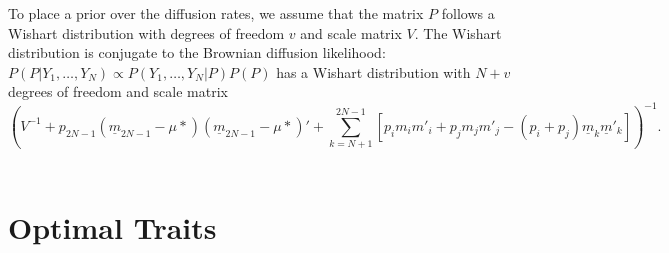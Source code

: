 \documentclass[12pt]{article}
\begin{document}
To place a prior over the diffusion rates, we assume that the matrix $P$ follows a Wishart distribution with degrees
of freedom $v$ and scale matrix $V$.  The Wishart distribution is conjugate to the Brownian diffusion likelihood: 
$P(P | Y_1,\dots,Y_N) \propto  P(Y_1,\dots,Y_N |P) P(P)$ has a Wishart distribution with $N+v$ degrees of freedom and scale matrix
\begin{equation*}
\left( V^{-1} + p_{2N-1}(\underline{m}_{2N-1} - \mu*)(\underline{m}_{2N-1} - \mu*)'  
+ \sum_{k=N+1}^{2N-1} [ p_i m_i m'_i + p_j m_j m'_j - (p_i + p_j)\underline{m}_k \underline{m}'_k]  \right)^{-1} . 
\end{equation*}
\\[4ex]







\section{Optimal Traits} 
\end{document}

